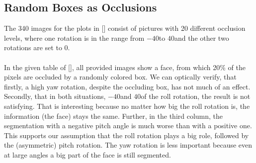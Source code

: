 \subsection{Random Boxes as Occlusions}
The 340 images for the plots in [] consist of pictures with 20 different occlusion levels, where one rotation is in the range from $-40$\textdegree to $40$\textdegree and the other two rotations are set to $0$.\\
\\
In the given table of [], all provided images show a face, from which 20\% of the pixels are occluded by a randomly colored box. We can optically verify, that firstly, a high yaw rotation, despite the occluding box, has not much of an effect. Secondly, that in both situations, $-40$\textdegree and $40$\textdegree of the roll rotation, the result is not satisfying. That is interesting because no matter how big the roll rotation is, the information (the face) stays the same. Further, in the third column, the segmentation with a negative pitch angle is much worse than with a positive one. This supports our assumption that the roll rotation plays a big role, followed by the (asymmetric) pitch rotation. The yaw rotation is less important because even at large angles a big part of the face is still segmented.

